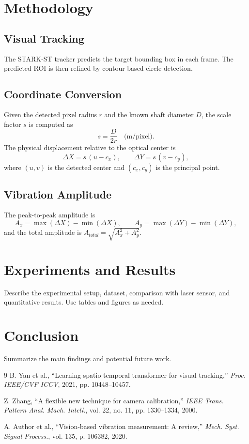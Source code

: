 \documentclass[12pt,a4paper]{article}
\begin{document}
\section{Methodology}
\subsection{Visual Tracking}
The STARK-ST tracker predicts the target bounding box in each frame.
The predicted ROI is then refined by contour-based circle detection.

\subsection{Coordinate Conversion}
Given the detected pixel radius $r$ and the known shaft diameter $D$,
the scale factor $s$ is computed as
\begin{equation}
s = \frac{D}{2r} \quad \text{(m/pixel)}.
\end{equation}
The physical displacement relative to the optical center is
\begin{equation}
\Delta X = s \,(u - c_x), \qquad \Delta Y = s \,(v - c_y),
\end{equation}
where $(u,v)$ is the detected center and $(c_x,c_y)$ is the principal point.

\subsection{Vibration Amplitude}
The peak-to-peak amplitude is
\begin{equation}
A_x = \max(\Delta X) - \min(\Delta X), \qquad
A_y = \max(\Delta Y) - \min(\Delta Y),
\end{equation}
and the total amplitude is $A_{total} = \sqrt{A_x^2 + A_y^2}$.

\section{Experiments and Results}
Describe the experimental setup, dataset, comparison with laser sensor, and quantitative results.
Use tables and figures as needed.

\section{Conclusion}
Summarize the main findings and potential future work.

\begin{thebibliography}{9}
B. Yan et al., ``Learning spatio-temporal transformer for visual tracking,'' \textit{Proc. IEEE/CVF ICCV}, 2021, pp. 10448--10457.

Z. Zhang, ``A flexible new technique for camera calibration,'' \textit{IEEE Trans. Pattern Anal. Mach. Intell.}, vol. 22, no. 11, pp. 1330--1334, 2000.

A. Author et al., ``Vision-based vibration measurement: A review,'' \textit{Mech. Syst. Signal Process.}, vol. 135, p. 106382, 2020.
\end{thebibliography}
\end{document}
